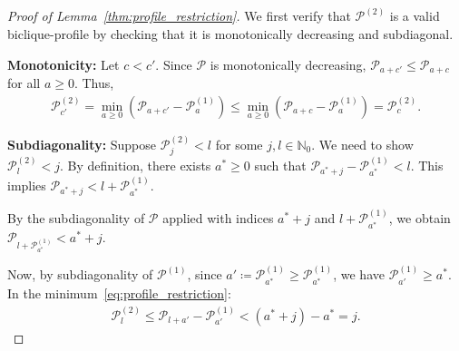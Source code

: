 \documentclass{article}
\newcommand{\NN}{\mathbb{N}}
\theoremstyle{definition}
\theoremstyle{definition}
\theoremstyle{definition}
\theoremstyle{definition}
\theoremstyle{definition}
\theoremstyle{definition}
\theoremstyle{definition}
\theoremstyle{definition}
\theoremstyle{definition}
\theoremstyle{definition}
\newenvironment{proofref}[2]{%
  \begin{proof}[Proof of #1~\ref{#2}]%
}{%
  \end{proof}%
}
\begin{document}
\begin{proofref}{Lemma}{thm:profile_restriction}
    We first verify that $\mathscr{P}^{(2)}$ is a valid biclique-profile by checking that it is monotonically decreasing and subdiagonal.

    \textbf{Monotonicity:} Let $c < c'$. Since $\mathscr{P}$ is monotonically decreasing, $\mathscr{P}_{a+c'} \leq \mathscr{P}_{a+c}$ for all $a \geq 0$. Thus,
    \begin{align*}
        \mathscr{P}^{(2)}_{c'} = \min_{a \geq 0} \left( \mathscr{P}_{a+c'} - \mathscr{P}^{(1)}_{a} \right) \leq \min_{a \geq 0} \left( \mathscr{P}_{a+c} - \mathscr{P}^{(1)}_{a} \right) = \mathscr{P}^{(2)}_{c}.
    \end{align*}

    \textbf{Subdiagonality:} Suppose $\mathscr{P}^{(2)}_{j} < l$ for some $j, l \in \NN_0$. We need to show $\mathscr{P}^{(2)}_{l} < j$. By definition, there exists $a^* \geq 0$ such that $\mathscr{P}_{a^*+j} - \mathscr{P}^{(1)}_{a^*} < l$. This implies $\mathscr{P}_{a^*+j} < l + \mathscr{P}^{(1)}_{a^*}$.

    By the subdiagonality of $\mathscr{P}$ applied with indices $a^* + j$ and $l + \mathscr{P}^{(1)}_{a^*}$, we obtain $\mathscr{P}_{l + \mathscr{P}^{(1)}_{a^*}} < a^* + j$.

    Now, by subdiagonality of $\mathscr{P}^{(1)}$, since $a' \coloneq \mathscr{P}^{(1)}_{a^*} \geq \mathscr{P}^{(1)}_{a^*}$, we have $\mathscr{P}^{(1)}_{a'} \geq a^*$. In the minimum~\eqref{eq:profile_restriction}:
    \begin{align*}
        \mathscr{P}^{(2)}_{l} \leq \mathscr{P}_{l + a'} - \mathscr{P}^{(1)}_{a'} < (a^* + j) - a^* = j.
    \end{align*}


\end{proofref}
\end{document}

